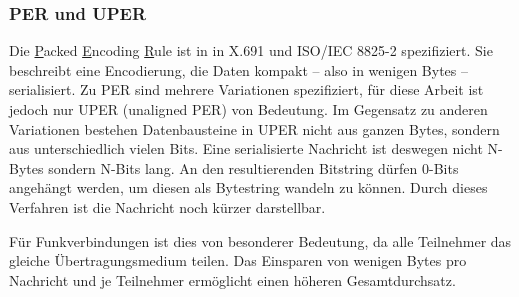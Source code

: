 \subsubsection{PER und UPER}

Die \underline{P}acked \underline{E}ncoding \underline{R}ule ist in in X.691 \cite{asn:itu:x691} und ISO/IEC 8825-2 \cite{asn:iso} spezifiziert.
Sie beschreibt eine Encodierung, die Daten kompakt -- also in wenigen Bytes -- serialisiert.
Zu PER sind mehrere Variationen spezifiziert, für diese Arbeit ist jedoch nur UPER (unaligned PER) von Bedeutung.
Im Gegensatz zu anderen Variationen bestehen Datenbausteine in UPER nicht aus ganzen Bytes, sondern aus unterschiedlich vielen Bits.
Eine serialisierte Nachricht ist deswegen nicht N-Bytes sondern N-Bits lang.
An den resultierenden Bitstring dürfen 0-Bits angehängt werden, um diesen als Bytestring wandeln zu können.
Durch dieses Verfahren ist die Nachricht noch kürzer darstellbar.

Für Funkverbindungen ist dies von besonderer Bedeutung, da alle Teilnehmer das gleiche Übertragungsmedium teilen.
Das Einsparen von wenigen Bytes pro Nachricht und je Teilnehmer ermöglicht einen höheren Gesamtdurchsatz.
